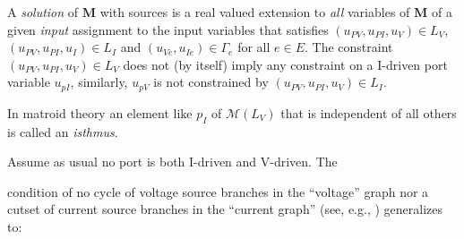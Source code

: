 \documentclass{article}
\DeclareMathOperator{\rank}{rank}
\newcommand{\sminus}{\backslash}
\newcommand{\extra}[1]{}
\begin{document}
A \textit{solution} of $\mathbf{M}$ with sources
is a real valued extension to \textit{all} variables of $\mathbf{M}$ 
of a given \textit{input} assignment to the input variables
that satisfies
$(u_{\mathit{PV}}, u_{\mathit{PI}}, u_V) \in L_V$,
$(u_{\mathit{PV}}, u_{\mathit{PI}}, u_I) \in L_I$
and
$(u_{\mathit{Ve}}, u_{\mathit{Ie}}) \in \Gamma_e$ for all
$e\in E$.
The constraint 
$(u_{\mathit{PV}}, u_{\mathit{PI}}, u_V) \in L_V$ 
does not (by itself) imply any constraint
on a I-driven port variable $u_{\mathit{pI}}$, similarly, 
$u_{\mathit{pV}}$ is not constrained
by 
$(u_{\mathit{PV}}, u_{\mathit{PI}}, u_V) \in L_I$.
\extra{Port variables are not constrained
by the constitutive laws $\Gamma$ (by themselves) either.}
In matroid theory an element like $p_I$ of
$\mathcal{M}(L_V)$ that is independent of all others
is called an \textit{isthmus}.

\extra{
In the language of matroid theory, we can call the element $p_I$ an 
\textit{isthmus} of the matroid $\mathcal{M}(L_V)$; similarly, $p_V$ is
an isthmus of $\mathcal{M}(L_I)$.  In general, the matroid represented by
a matrix is characterized by the collection $\mathcal{I}$ 
of \textit{independent sets} 
of matrix columns, where a set of columns is called independent when it is
linearly independent.  (Matroid theory studies what can be deduced by 
the following three axioms satisfied by $\mathcal{I}$: (1) 
$\mathcal{I}\neq\emptyset$. 
(2) If $A\subset B\in\mathcal{I}$ then $A\in\mathcal{I}$.  (3) 
If $A$, $B$ $\in\mathcal{I}$ and $|A|<|B|$, then there exists $e\in B\sminus A$ 
for which $A\cup\{e\}\in\mathcal{I}$.  For example, an isthmus $e$ is 
characterized by $A\cup\{e\}\in\mathcal{I}$ for all $A\in\mathcal{I}$.
The \textit{rank} of a subset $C\in U$ is the size of the largest independent
subset of $C$.  
}

\extra{We say a subspace pair problem with sources $S$ 
is \textit{well-posed} when for all input assignments there is a unique 
solution.}

Assume as usual 
no port is both I-driven and V-driven.
The 
\extra{well-known necessary condition
for an electrical network to have a unique 
solution for all choices of source values is}
condition of no cycle of voltage source branches
in the ``voltage'' graph nor a
cutset of current source branches in the ``current graph'' (see, e.g.,
\cite{ChensBook})
generalizes to:
\end{document}
